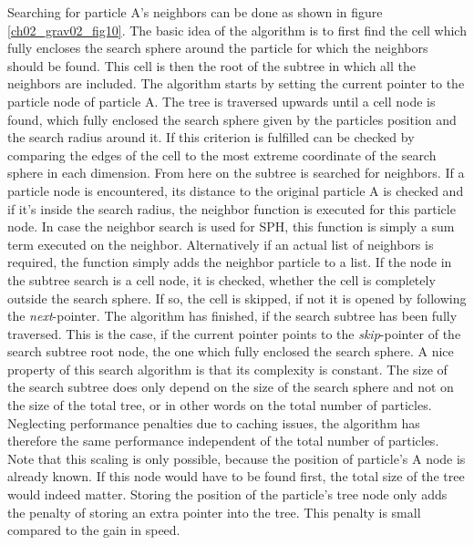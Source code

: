 Searching for particle A's neighbors can be done as shown in figure \ref{ch02_grav02_fig10}. The basic idea of the algorithm is to first find the cell which fully encloses the search sphere around the particle for which the neighbors should be found. This cell is then the root of the subtree in which all the neighbors are included. The algorithm starts by setting the current pointer to the particle node of  particle A. The tree is traversed upwards until a cell node is found, which fully enclosed the search sphere given by the particles position and the search radius around it. If this criterion is fulfilled can be checked by comparing the edges of the cell to the most extreme coordinate of the search sphere in each dimension. From here on the subtree is searched for neighbors. If a particle node is encountered, its distance to the original particle A is checked and if it's inside the search radius, the neighbor function is executed for this particle node. In case the neighbor search is used for SPH, this function is simply a sum term executed on the neighbor. Alternatively if an actual list of neighbors is required, the function simply adds the neighbor particle to a list. If the node in the subtree search is a cell node, it is checked, whether the cell is completely outside the search sphere. If so, the cell is skipped, if not it is opened by following the \emph{next}-pointer. The algorithm has finished, if the search subtree has been fully traversed. This is the case, if the current pointer points to the \emph{skip}-pointer of the search subtree root node, the one which fully enclosed the search sphere. 
A nice property of this search algorithm is that its complexity is constant. The size of the search subtree does only depend on the size of the search sphere and not on the size of the total tree, or in other words on the total number of particles. Neglecting performance penalties due to caching issues, the algorithm has therefore the same performance independent of the total number of particles. Note that this scaling is only possible, because the position of particle's A node is already known. If this node would have to be found first, the total size of the tree would indeed matter. Storing the position of the particle's tree node only adds the penalty of storing an extra pointer into the tree. This penalty is small compared to the gain in speed.

